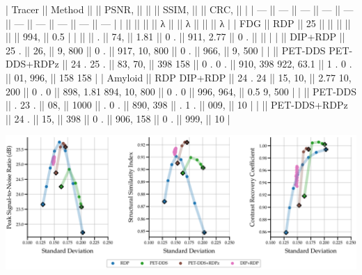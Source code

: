 \documentclass{article}
\begin{document}
| Tracer  || Method               ||           || PSNR,   ||              ||         || SSIM,                  ||         || CRC,      ||            |
| ---     || ---                  || ---       || ---     || ---          || ---     || ---                    || ---     || ---       || ---        |
|         ||                      ||           ||         || λ            ||         || λ                      ||         ||           || λ          |
| FDG     || RDP                  || 25        ||         ||              ||         ||                        ||         || 994,      || 0.5        |
|         ||                      || .         || 74,     || 1.81         || 0 .     || 911, 2.77              || 0 .     ||           ||            |
|         || DIP+RDP              || 25 .      || 26,     || 9, 800       || 0 .     || 917, 10, 800           || 0 .     || 966,      || 9, 500     |
|         || PET-DDS PET-DDS+RDPz || 24 . 25 . || 83, 70, || 398 158      || 0 . 0 . || 910, 398 922, 63.1     || 1 . 0 . || 01, 996,  || 158 158    |
| Amyloid || RDP DIP+RDP          || 24 . 24   || 15, 10, || 2.77 10, 200 || 0 . 0   || 898, 1.81 894, 10, 800 || 0 . 0   || 996, 964, || 0.5 9, 500 |
|         || PET-DDS              || . 23 .    || 08,     || 1000         || . 0 .   || 890, 398               || . 1 .   || 009,      || 10         |
|         || PET-DDS+RDPz         || 24 .      || 15,     || 398          || 0 .     || 906, 158               || 0 .     || 999,      || 10         |


\includegraphics{_page_19_Figure_1.png}
\end{document}
